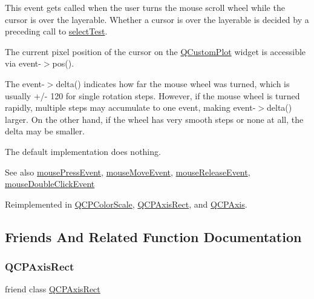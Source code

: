 This event gets called when the user turns the mouse scroll wheel while the cursor is over the layerable. Whether a cursor is over the layerable is decided by a preceding call to \hyperlink{class_q_c_p_layerable_a04db8351fefd44cfdb77958e75c6288e}{select\+Test}.

The current pixel position of the cursor on the \hyperlink{class_q_custom_plot}{Q\+Custom\+Plot} widget is accessible via {\ttfamily event-\/$>$pos()}.

The {\ttfamily event-\/$>$delta()} indicates how far the mouse wheel was turned, which is usually +/-\/ 120 for single rotation steps. However, if the mouse wheel is turned rapidly, multiple steps may accumulate to one event, making {\ttfamily event-\/$>$delta()} larger. On the other hand, if the wheel has very smooth steps or none at all, the delta may be smaller.

The default implementation does nothing.

\begin{DoxySeeAlso}{See also}
\hyperlink{class_q_c_p_layerable_af6567604818db90f4fd52822f8bc8376}{mouse\+Press\+Event}, \hyperlink{class_q_c_p_layerable_a9eee1ba47fd69be111059ca3881933e4}{mouse\+Move\+Event}, \hyperlink{class_q_c_p_layerable_aa0d79b005686f668622bbe66ac03ba2c}{mouse\+Release\+Event}, \hyperlink{class_q_c_p_layerable_a4171e2e823aca242dd0279f00ed2de81}{mouse\+Double\+Click\+Event} 
\end{DoxySeeAlso}


Reimplemented in \hyperlink{class_q_c_p_color_scale_a63cf19be184f6670c9495ad3a9a1baeb}{Q\+C\+P\+Color\+Scale}, \hyperlink{class_q_c_p_axis_rect_a93eeaa0c127d6d6fe8171b2455080262}{Q\+C\+P\+Axis\+Rect}, and \hyperlink{class_q_c_p_axis_a71643d27524a843230b5ba68085b3d9b}{Q\+C\+P\+Axis}.



\subsection{Friends And Related Function Documentation}
\mbox{\label{class_q_c_p_layerable_acbf20ecb140f66c5fd1bc64ae0762990}} 
\subsubsection{\texorpdfstring{Q\+C\+P\+Axis\+Rect}{QCPAxisRect}}
{\footnotesize\ttfamily friend class \hyperlink{class_q_c_p_axis_rect}{Q\+C\+P\+Axis\+Rect}\hspace{0.3cm}{\ttfamily [friend]}}

